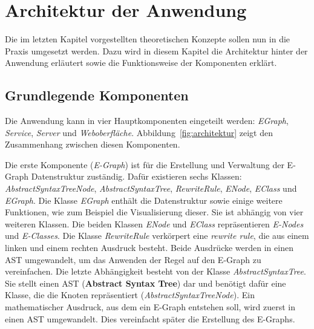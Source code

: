 \section{Architektur der Anwendung}\label{sec:architektur}

Die im letzten Kapitel vorgestellten theoretischen Konzepte sollen nun in die Praxis umgesetzt werden.
Dazu wird in diesem Kapitel die Architektur hinter der Anwendung erläutert sowie die Funktionsweise der Komponenten erklärt.

\subsection{Grundlegende Komponenten}

Die Anwendung kann in vier Hauptkomponenten eingeteilt werden: \textit{EGraph}, \textit{Service}, \textit{Server} und \textit{Weboberfläche}.
Abbildung~\ref{fig:architektur} zeigt den Zusammenhang zwischen diesen Komponenten. 



Die erste Komponente (\textit{E-Graph}) ist für die Erstellung und Verwaltung der E-Graph Datenstruktur zuständig. Dafür existieren sechs Klassen:
\textit{AbstractSyntaxTreeNode}, \textit{AbstractSyntaxTree}, \textit{RewriteRule}, \textit{ENode}, \textit{EClass} und \textit{EGraph}.
Die Klasse \textit{EGraph} enthält die Datenstruktur sowie einige weitere Funktionen, wie zum Beispiel die Visualisierung dieser.
Sie ist abhängig von vier weiteren Klassen. Die beiden Klassen \textit{ENode} und \textit{EClass} repräsentieren \textit{E-Nodes} und \textit{E-Classes}.
Die Klasse \textit{RewriteRule} verkörpert eine \textit{rewrite rule}, die aus einem linken und einem rechten Ausdruck besteht. Beide Ausdrücke werden in einen AST umgewandelt, 
um das Anwenden der Regel auf den E-Graph zu vereinfachen.
Die letzte Abhängigkeit besteht von der Klasse \textit{AbstractSyntaxTree}. Sie stellt einen AST (\textbf{Abstract Syntax Tree}) dar und benötigt dafür eine Klasse, 
die die Knoten repräsentiert (\textit{AbstractSyntaxTreeNode}).
Ein mathematischer Ausdruck, aus dem ein E-Graph entstehen soll, wird zuerst in einen AST umgewandelt. Dies vereinfacht später die Erstellung des E-Graphs.


